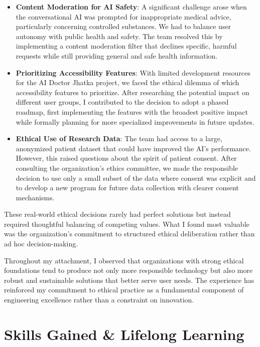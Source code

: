 \documentclass[12pt,a4paper]{article}
\begin{document}
\begin{itemize}
    \item \textbf{Content Moderation for AI Safety}: A significant challenge arose when the conversational AI was prompted for inappropriate medical advice, particularly concerning controlled substances. We had to balance user autonomy with public health and safety. The team resolved this by implementing a content moderation filter that declines specific, harmful requests while still providing general and safe health information.
    
    \item \textbf{Prioritizing Accessibility Features}: With limited development resources for the AI Doctor Jhatka project, we faced the ethical dilemma of which accessibility features to prioritize. After researching the potential impact on different user groups, I contributed to the decision to adopt a phased roadmap, first implementing the features with the broadest positive impact while formally planning for more specialized improvements in future updates.
    
    \item \textbf{Ethical Use of Research Data}: The team had access to a large, anonymized patient dataset that could have improved the AI's performance. However, this raised questions about the spirit of patient consent. After consulting the organization's ethics committee, we made the responsible decision to use only a small subset of the data where consent was explicit and to develop a new program for future data collection with clearer consent mechanisms.
    
\end{itemize}

These real-world ethical decisions rarely had perfect solutions but instead required thoughtful balancing of competing values. What I found most valuable was the organization's commitment to structured ethical deliberation rather than ad hoc decision-making.

Throughout my attachment, I observed that organizations with strong ethical foundations tend to produce not only more responsible technology but also more robust and sustainable solutions that better serve user needs. The experience has reinforced my commitment to ethical practice as a fundamental component of engineering excellence rather than a constraint on innovation.


\newpage

\section{Skills Gained \& Lifelong Learning}
\end{document}
